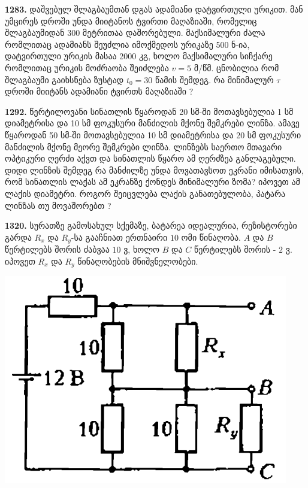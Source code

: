 \documentclass[12pt,a4paper,]{report}
\begin{document}
\textbf{1283.} დაშვებულ შლაგბაუმთან დგას ადამიანი დატვირთული ურიკით. მან უმცირეს დროში უნდა მიიტანოს ტვირთი მაღაზიაში, რომელიც შლაგბაუმიდან 300 მეტრითაა დაშორებული. მაქსიმალური ძალა რომლითაც ადამიანს შეუძლია იმოქმედოს ურიკაზე 500 ნ-ია, დატვირთული ურიკის მასაა 2000 კგ, ხოლო მაქსიმალური სიჩქარე რომლითაც ურიკის მოძრაობა შეიძლება $v=5$ მ/წმ. ცნობილია რომ შლაგბაუმი გაიხსნება ზუსტად $t_0=30$ წამის შემდეგ. რა მინიმალურ $\tau$ დროში მიიტანს ადამიანი ტვირთს მაღაზიაში ? 

\textbf{1292.} წერტილოვანი სინათლის წყაროდან 20 სმ-ში მოთავსებულია 1 სმ დიამეტრისა და 10 სმ ფოკუსური მანძილის მქონე შემკრები ლინზა. ამავე წყაროდან 50 სმ-ში მოთავსებულია 10 სმ დიამეტრისა და 20 სმ ფოკუსური მანძილის მქონე მეორე შემკრები ლინზა. ლინზებს საერთო მთავარი ოპტიკური ღერძი აქვთ და სინათლის წყარო ამ ღერძზეა განლაგებული. დიდი ლინზის შემდეგ რა მანძილზე უნდა მოვათავსოთ ეკრანი იმისათვის, რომ სინათლის ლაქას ამ ეკრანზე ქონდეს მინიმალური ზომა? იპოვეთ ამ ლაქის დიამეტრი. როგორ შეიცვლება ლაქის განათებულობა, პატარა ლინზას თუ მოვაშორებთ ?

\textbf{1320.} სურათზე გამოსახულ სქემაზე, ბატარეა იდეალურია, რეზისტორები გარდა $R_x$ და $R_y$-სა გააჩნიათ ერთნაირი $10$ ომი წინაღობა. $A$ და $B$ წერტილებს შორის ძაბვაა $10$ ვ, ხოლო $B$ და $C$ წერტილებს შორის - $2$ ვ. იპოვეთ $R_x$ და $R_y$ წინაღობების მნიშვნელობები.
		\begin{center}
			\includegraphics[scale=0.4]{images/F1320.png}
		\end{center}
	
\end{document}

